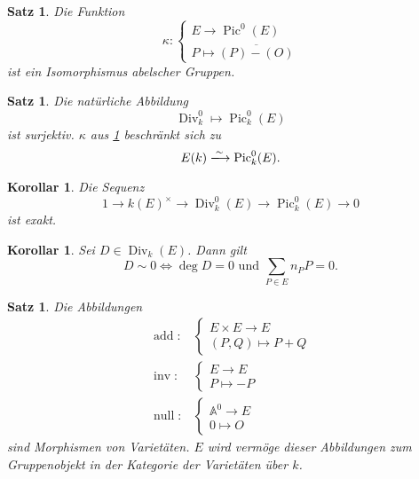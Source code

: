 \documentclass{amsart}
\theoremstyle{plain}
\newtheorem{proposition}[subsection]{Satz}
\newtheorem{corollary}[subsection]{Korollar}
\theoremstyle{definition}
\newcommand{\pic}{\operatorname{Pic}}
\newcommand{\divgrp}{\operatorname{Div}}
\newcommand{\rightarrowiso}{\xlongrightarrow{\sim}}
\newcommand{\affinespace}{\mathds{A}}
\begin{document}
\begin{proposition}
	\label{prop-isomorphism-pic}
	Die Funktion
	\begin{equation*}
		\kappa \colon \begin{cases}
			E \rightarrow \pic^0(E) \\
			P \mapsto \overline{(P) - (O)}
		\end{cases}
	\end{equation*}
	ist ein Isomorphismus abelscher Gruppen.
\end{proposition}

\begin{proposition}
	Die natürliche Abbildung
	\begin{equation*}
		\divgrp_k^0 \mapsto \pic_k^0(E)
	\end{equation*}
	ist surjektiv. $\kappa$ aus \ref{prop-isomorphism-pic} beschränkt sich zu 
	\begin{equation*}
		E(k) \rightarrowiso \pic_k^0(E).
	\end{equation*}
\end{proposition}

\begin{corollary}
	Die Sequenz
	\begin{equation*}
		1 \rightarrow k(E)^{\times} \rightarrow \divgrp_k^0(E) \rightarrow \pic_k^0(E) \rightarrow 0
	\end{equation*}
	ist exakt.
\end{corollary}

\begin{corollary}
	Sei $D \in \divgrp_k(E)$. Dann gilt
	\begin{equation*}
		D \sim 0 \Leftrightarrow \deg D = 0 \text{ und } \sum_{P \in E} n_P P = 0.
	\end{equation*}
\end{corollary}

\begin{proposition}
	Die Abbildungen
	\begin{align*}
		\operatorname{add} \colon &
		\begin{cases}
			E \times E \rightarrow E \\
			(P, Q) \mapsto P + Q
		\end{cases} \\
		\operatorname{inv} \colon &
		\begin{cases}
			E \rightarrow E \\
			P \mapsto -P
		\end{cases} \\
		\operatorname{null} \colon &
		\begin{cases}
			\affinespace^0 \rightarrow E \\
			0 \mapsto O
		\end{cases}
	\end{align*}
	sind Morphismen von Varietäten. $E$ wird vermöge dieser Abbildungen zum Gruppenobjekt in der Kategorie der Varietäten über $k$.
\end{proposition}

\printbibliography
\end{document}

